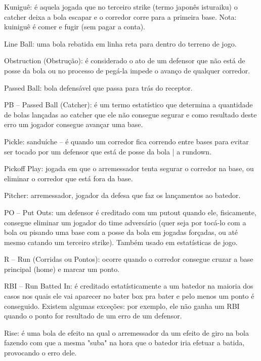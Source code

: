  Kuniguê: é aquela jogada que no terceiro strike (termo japonês isturaiku) o catcher deixa a bola escapar e o corredor corre para a primeira base. Nota: kuiniguê é comer e fugir (sem pagar a conta).


 Line Ball: uma bola rebatida em linha reta para dentro do terreno de jogo.

 Obstruction (Obstrução): é considerado o ato de um defensor que não está de posse da bola ou no processo de pegá-la impede o avanço de qualquer corredor.

 Passed Ball: bola defensável que passa para trás do receptor.

 PB -- Passed Ball (Catcher): é um termo estatístico que determina a quantidade de bolas lançadas ao catcher que ele não consegue segurar e como resultado deste erro um jogador consegue avançar uma base.

 Pickle: sanduíche -- é quando um corredor fica correndo entre bases para evitar ser tocado por um defensor que está de posse da bola | a rundown.

 Pickoff Play: jogada em que o arremessador tenta segurar o corredor na base, ou eliminar o corredor que está fora da base.

 Pitcher: arremessador, jogador da defesa que faz os lançamentos ao batedor.

 PO -- Put Outs: um defensor é creditado com um \gls{putout} quando ele, fisicamente, consegue eliminar um jogador do time adversário (quer seja por
 tocá-lo com a bola ou pisando uma base com a posse da bola em jogadas forçadas, ou até mesmo catando um terceiro strike). Também usado em
 estatísticas de jogo.

 R -- Run (Corridas ou Pontos): ocorre quando o corredor consegue cruzar a base principal (home) e marcar um ponto.

 RBI -- Run Batted In: é creditado estatísticamente a um batedor na maioria dos casos nos quais ele vai aparecer no bater box pra bater e pelo menos um ponto é conseguido. Existem algumas exceções: por exemplo, ele não ganha um RBI quando o ponto for resultado de um erro de um defensor.

 Rise: é uma bola de efeito na qual o arremessador da um efeito de giro na bola fazendo com que a mesma "suba" na hora que o batedor iria efetuar a batida, provocando o erro dele.



